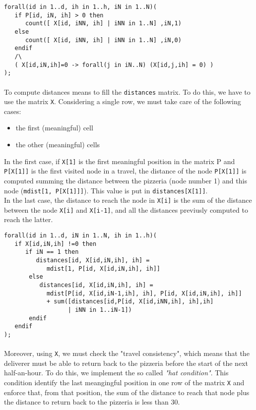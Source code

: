 \documentclass[10pt]{article}
\begin{document}
	\begin{verbatim}
forall(id in 1..d, ih in 1..h, iN in 1..N)(
   if P[id, iN, ih] > 0 then
      count([ X[id, iNN, ih] | iNN in 1..N] ,iN,1) 
   else
      count([ X[id, iNN, ih] | iNN in 1..N] ,iN,0)
   endif
   /\
   ( X[id,iN,ih]=0 -> forall(j in iN..N) (X[id,j,ih] = 0) )
);
	\end{verbatim}


	\paragraph*{}
	To compute distances means to fill the \texttt{distances} matrix.
    To do this, we have to use the matrix \texttt{X}. 
	Considering a single row, we must take care of the following cases:
	\begin{itemize}
		\item the first (meaningful) cell
		\item the other (meaningful) cells
	\end{itemize}
	
	In the first case, if \texttt{X[1]} is the first meaningful position in the 
	matrix P and \texttt{P[X[1]]} is the first visited node in a travel,
	the distance of the node \texttt{P[X[1]]} is computed summing the 
	distance between the pizzeria (node number 1) and this node (\texttt{mdist[1, P[X[1]]]}).
	This value is put in \texttt{distances[X[1]]}.\\
	
	In the last case, the distance to reach the node in \texttt{X[i]} is 
	the sum of the distance between the node \texttt{X[i]} and \texttt{X[i-1]}, and all 
	the distances previusly computed to reach the latter. 
	\begin{verbatim}
forall(id in 1..d, iN in 1..N, ih in 1..h)(
   if X[id,iN,ih] !=0 then
      if iN == 1 then
         distances[id, X[id,iN,ih], ih] = 
            mdist[1, P[id, X[id,iN,ih], ih]] 
       else
          distances[id, X[id,iN,ih], ih] = 
            mdist[P[id, X[id,iN-1,ih], ih], P[id, X[id,iN,ih], ih]] 
         	+ sum([distances[id,P[id, X[id,iNN,ih], ih],ih]
                  | iNN in 1..iN-1])
       endif
   endif
);
	\end{verbatim}

	\paragraph*{}
	Moreover, using \texttt{X}, we must check the "travel consistency", which 
	means that the deliverer must be able to return back to the pizzeria before the 
	start of the next half-an-hour. 
	To do this, we implement the so called \textit{"hat condition"}. This condition 
	identify the last meangingful position in one row of the matrix \texttt{X}
	and enforce that, from that position, the sum of the distance to reach
	that node plus the distance to return back to the pizzeria is less than 30.
\end{document}
